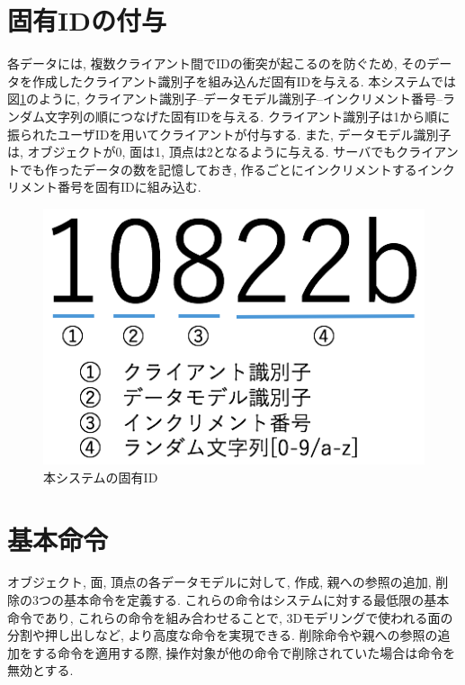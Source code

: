 \section{固有IDの付与} \label{固有id}
各データには, 複数クライアント間でIDの衝突が起こるのを防ぐため, そのデータを作成したクライアント識別子を組み込んだ固有IDを与える.
本システムでは図\ref{uuid}のように, クライアント識別子--データモデル識別子--インクリメント番号--ランダム文字列の順につなげた固有IDを与える. クライアント識別子は1から順に振られたユーザIDを用いてクライアントが付与する. また, データモデル識別子は, オブジェクトが0, 面は1, 頂点は2となるように与える. サーバでもクライアントでも作ったデータの数を記憶しておき, 作るごとにインクリメントするインクリメント番号を固有IDに組み込む.
\begin{figure}[htbp]
  \begin{center}
    \includegraphics[scale=0.5]{images/uuid}
    \caption{本システムの固有ID}
    \label{uuid}
  \end{center}
\end{figure}
\section{基本命令} \label{ope}
オブジェクト, 面, 頂点の各データモデルに対して, 作成, 親への参照の追加, 削除の3つの基本命令を定義する.
これらの命令はシステムに対する最低限の基本命令であり, これらの命令を組み合わせることで, 3Dモデリングで使われる面の分割や押し出しなど, より高度な命令を実現できる.
削除命令や親への参照の追加をする命令を適用する際, 操作対象が他の命令で削除されていた場合は命令を無効とする.
